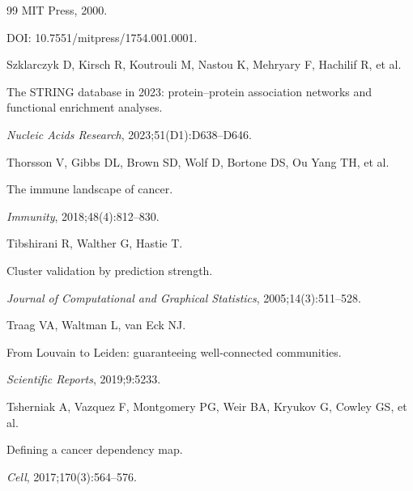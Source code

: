 \documentclass[12pt,a4paper]{article}
\begin{document}
\begin{thebibliography}{99}
MIT Press, 2000.



DOI: 10.7551/mitpress/1754.001.0001.




Szklarczyk D, Kirsch R, Koutrouli M, Nastou K, Mehryary F, Hachilif R, et al.




The STRING database in 2023: protein--protein association networks and functional enrichment analyses.




\textit{Nucleic Acids Research}, 2023;51(D1):D638--D646.




Thorsson V, Gibbs DL, Brown SD, Wolf D, Bortone DS, Ou Yang TH, et al.




The immune landscape of cancer.




\textit{Immunity}, 2018;48(4):812--830.




Tibshirani R, Walther G, Hastie T.




Cluster validation by prediction strength.




\textit{Journal of Computational and Graphical Statistics}, 2005;14(3):511--528.




Traag VA, Waltman L, van Eck NJ.




From Louvain to Leiden: guaranteeing well-connected communities.




\textit{Scientific Reports}, 2019;9:5233.




Tsherniak A, Vazquez F, Montgomery PG, Weir BA, Kryukov G, Cowley GS, et al.




Defining a cancer dependency map.




\textit{Cell}, 2017;170(3):564--576.




\end{thebibliography}
\end{document}

